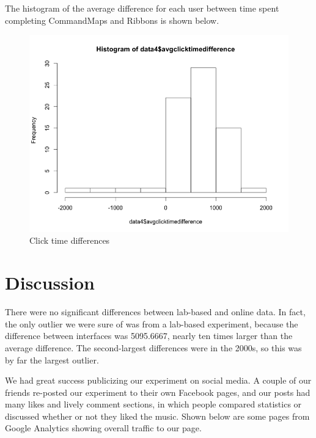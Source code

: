 \documentclass[10pt,a4paper]{article}
\begin{document}
The histogram of the average difference for each user between time spent completing CommandMaps and Ribbons is shown below.

\begin{figure}
\includegraphics[width=\linewidth]{avgclicktimediff.png} 
\caption{Click time differences}
\end{figure}


\section{Discussion}
There were no significant differences between lab-based and online data. In fact, the only outlier we were sure of was from a lab-based experiment, because the difference between interfaces was 5095.6667, nearly ten times larger than the average difference. The second-largest differences were in the 2000s, so this was by far the largest outlier.

We had great success publicizing our experiment on social media. A couple of our friends re-posted our experiment to their own Facebook pages, and our posts had many likes and lively comment sections, in which people compared statistics or discussed whether or not they liked the music. Shown below are some pages from Google Analytics showing overall traffic to our page.
\\
\end{document}
